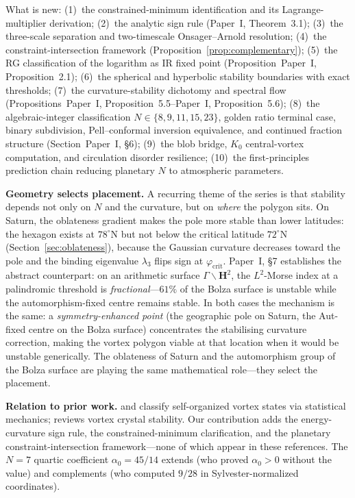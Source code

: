 \smallskip\noindent
What is new:
(1)~the constrained-minimum identification and its
Lagrange-multiplier derivation;
(2)~the analytic sign rule (Paper~I, Theorem~3.1);
(3)~the three-scale separation and two-timescale Onsager--Arnold
resolution;
(4)~the constraint-intersection framework
(Proposition~\ref{prop:complementary});
(5)~the RG classification of the logarithm as IR fixed point
(Proposition~Paper~I, Proposition~2.1);
(6)~the spherical and hyperbolic stability boundaries
with exact thresholds;
(7)~the curvature-stability dichotomy and spectral flow
(Propositions~Paper~I, Proposition~5.5--Paper~I, Proposition~5.6);
(8)~the algebraic-integer classification $N \in \{8,9,11,15,23\}$,
golden ratio terminal case, binary subdivision, Pell--conformal
inversion equivalence, and continued fraction structure
(Section~Paper~I, \S6);
(9)~the blob bridge, $K_0$ central-vortex computation, and
circulation disorder resilience;
(10)~the first-principles prediction chain reducing planetary
$N$ to atmospheric parameters.

\smallskip\noindent\textbf{Geometry selects placement.}
A recurring theme of the series is that stability depends not
only on $N$ and the curvature, but on \emph{where} the polygon
sits.  On Saturn, the oblateness gradient makes the pole more
stable than lower latitudes: the hexagon exists at
$78^\circ$N but not below the critical latitude
$72^\circ$N (Section~\ref{sec:oblateness}), because the
Gaussian curvature decreases toward the pole and the binding
eigenvalue $\lambda_3$ flips sign at $\varphi_{\mathrm{crit}}$.
Paper~I, \S7 establishes the abstract counterpart:
on an arithmetic surface
$\Gamma\backslash\mathbf{H}^2$, the $L^2$-Morse index at
a palindromic threshold is \emph{fractional}---$61\%$ of the
Bolza surface is unstable while the automorphism-fixed centre
remains stable.
In both cases the mechanism is the same: a
\emph{symmetry-enhanced point} (the geographic pole on Saturn,
the Aut-fixed centre on the Bolza surface) concentrates the
stabilising curvature correction, making the vortex polygon
viable at that location when it would be unstable generically.
The oblateness of Saturn and the automorphism group of the
Bolza surface are playing the same mathematical role---they
select the placement.

\smallskip\noindent\textbf{Relation to prior work.}
\citet{BouchetVenaille2012} and \citet{ChavanisSommeria1996} classify
self-organized vortex states via statistical mechanics;
\citet{Aref2003} reviews vortex crystal stability.
Our contribution adds the energy-curvature sign rule, the
constrained-minimum clarification, and the planetary
constraint-intersection framework---none of which appear in
these references.  The $N = 7$ quartic coefficient $\alpha_0 = 45/14$
extends \citet{KurakinYudovich2002} (who proved $\alpha_0 > 0$
without the value) and complements \citet{Schmidt2004} (who computed
$9/28$ in Sylvester-normalized coordinates).


